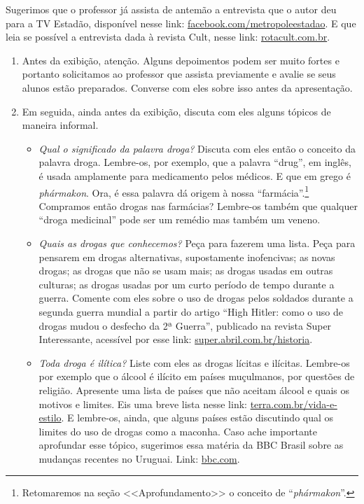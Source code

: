 \documentclass[11pt]{extarticle}
\begin{document}
		Sugerimos que o professor já assista de antemão a entrevista que o autor
		deu para a TV Estadão, disponível nesse link: 
		\href{https://www.facebook.com/metropoleestadao/videos/1772581939449060}{facebook.com/metropoleestadao}. E que leia se possível a entrevista dada à revista Cult, nesse 
		link: \href{https://rotacult.com.br/2017/08/dr-luis-marra-fala-sobre-o-livro-cronicas-do-crack/}{rotacult.com.br}. 
	\begin{enumerate}
		\item Antes da exibição, atenção. Alguns depoimentos podem ser muito fortes e portanto solicitamos 
		ao professor que assista previamente e avalie se seus alunos 
		estão preparados. Converse com eles sobre isso antes da apresentação.
		\item Em seguida, ainda antes da exibição, discuta com eles alguns tópicos de
		maneira informal.

		\begin{itemize}
			\item \textit{Qual o significado da palavra droga?} Discuta com eles então o conceito da 
			palavra droga. Lembre-os, por exemplo, que a palavra ``drug'', em inglês, 
			é usada amplamente para medicamento pelos médicos. E que em grego é \textit{phármakon}. 
			Ora, é essa palavra dá origem à nossa ``farmácia''.\footnote{Retomaremos
			na seção <<Aprofundamento>> o conceito de ``\textit{phármakon}''.}
			Compramos então drogas nas farmácias? Lembre-os também que qualquer ``droga 
			medicinal'' pode ser um remédio mas também um veneno. 

			\item \textit{Quais as drogas que conhecemos?} Peça para fazerem uma lista. Peça para 
			pensarem em drogas alternativas, supostamente inofencivas; as novas drogas; 
			as drogas que não se usam mais; as drogas usadas em outras culturas; as drogas usadas
			por um curto período de tempo durante a guerra. Comente com eles sobre o 
			uso de drogas pelos soldados durante a segunda guerra mundial a partir do 
			artigo ``High Hitler: como o uso de drogas mudou o desfecho da 2ª Guerra'', 
			publicado na revista Super Interessante, acessível por esse link: 
			\href{https://super.abril.com.br/historia/high-hitler-como-o-uso-de-drogas-mudou-o-desfecho-da-2a-guerra/}{super.abril.com.br/historia}.

			\item \textit{Toda droga é ilítica?} Liste com eles as drogas lícitas e ilícitas. Lembre-os 
			por exemplo que o álcool é ilícito em países muçulmanos, por questões de religião. 
			Apresente uma lista de países que não aceitam álcool e quais os motivos e limites. 
			Eis uma breve lista nesse link: \href{https://www.terra.com.br/vida-e-estilo/turismo/internacional/jornal-lista-10-paises-onde-bebida-alcoolica-e-proibida,a1aebf5da7afe310VgnVCM5000009ccceb0aRCRD.html}{terra.com.br/vida-e-estilo}. 
			E lembre-os, ainda, que alguns países estão discutindo 
			qual os limites do uso de drogas como a maconha. Caso ache importante 
			aprofundar esse tópico, sugerimos essa matéria da BBC Brasil sobre 
			as mudanças recentes no Uruguai. Link: 
			\href{https://www.bbc.com/portuguese/internacional-50842940}{bbc.com}.
		

\end{itemize}
\end{enumerate}
\end{document}
